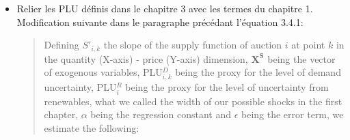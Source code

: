 \documentclass{article}
\begin{document}
\begin{itemize}

\item Relier les PLU définis dans le chapitre 3 avec les termes du chapitre 1.\\

Modification suivante dans le paragraphe précédant l'équation 3.4.1:\\
\begin{quote}
Defining $S'_{i,k}$ the slope of the supply function of auction $i$ at point $k$ in the quantity (X-axis) - price (Y-axis) dimension, $\boldsymbol{X^S}$ being the vector of exogenous variables, PLU$^D_{i,k}$ being the proxy for the level of demand uncertainty, PLU$^R_i$ being the proxy for the level of uncertainty from renewables, what we called the width of our possible shocks in the first chapter, $\alpha$ being the regression constant and $\epsilon$ being the error term, we estimate the following:
\end{quote}

\end{itemize}


\end{document}
